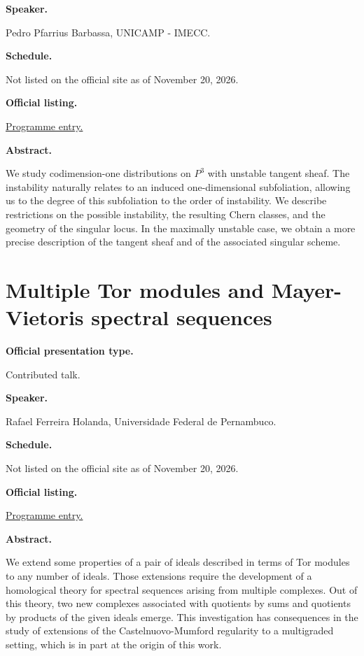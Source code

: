 \medskip\noindent
{\bf Speaker.}

Pedro Pfarrius Barbassa, UNICAMP - IMECC.

\medskip\noindent
{\bf Schedule.}

Not listed on the official site as of
November 20, 2026.

\medskip\noindent
{\bf Official listing.}

\href{%
https://sites.google.com/view/%
geoalgcompluff/legal/%
legal-2027-resumos#h.dant8g3oe5ea%
}{Programme entry.}

\medskip\noindent
{\bf Abstract.}

We study codimension-one distributions on
$P^3$ with unstable tangent sheaf. The
instability naturally relates to an induced
one-dimensional subfoliation, allowing us to
the degree of this subfoliation to the order
of instability. We describe restrictions on
the possible instability, the resulting Chern
classes, and the geometry of the singular
locus. In the maximally unstable case, we
obtain a more precise description of the
tangent sheaf and of the associated singular
scheme.

\section{Multiple Tor modules and
Mayer-Vietoris spectral sequences}
\label{section-multiple-tor-modules-and}

\medskip\noindent
{\bf Official presentation type.}

Contributed talk.

\medskip\noindent
{\bf Speaker.}

Rafael Ferreira Holanda, Universidade Federal
de Pernambuco.

\medskip\noindent
{\bf Schedule.}

Not listed on the official site as of
November 20, 2026.

\medskip\noindent
{\bf Official listing.}

\href{%
https://sites.google.com/view/%
geoalgcompluff/legal/%
legal-2027-resumos#h.dant8g3oe5ea%
}{Programme entry.}

\medskip\noindent
{\bf Abstract.}

We extend some properties of a pair of ideals
described in terms of Tor modules to any
number of ideals. Those extensions require
the development of a homological theory for
spectral sequences arising from multiple
complexes. Out of this theory, two new
complexes associated with quotients by sums
and quotients by products of the given ideals
emerge. This investigation has consequences
in the study of extensions of the
Castelnuovo-Mumford regularity to a
multigraded setting, which is in part at the
origin of this work.

